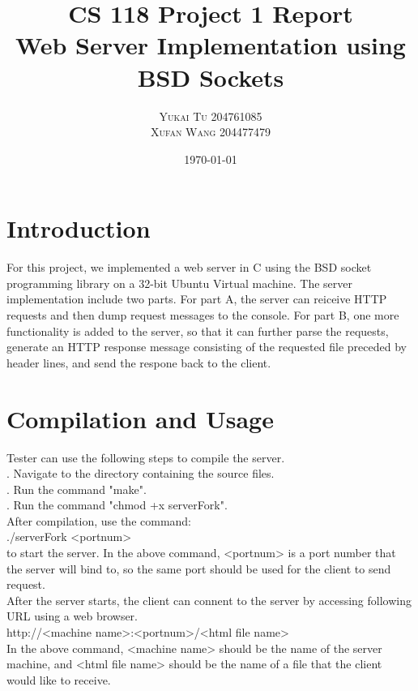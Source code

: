 \documentclass[a4paper, 11pt]{report}
\title{\LARGE{\textbf{CS 118 Project 1 Report}}\\
Web Server Implementation using BSD Sockets}
\author{\textsc{Yukai Tu 204761085}
\\\textsc{Xufan Wang 204477479}}
\date{\today}
\begin{document}
\maketitle


\section*{Introduction}

For this project, we implemented a web server in C using the BSD socket programming library on a 32-bit Ubuntu Virtual machine. The server implementation include two parts. For part A, the server can reiceive HTTP requests and then dump request messages to the console. For part B, one more functionality is added to the server, so that it can further parse the requests, generate an HTTP response message consisting of the requested file preceded by header lines, and send the respone back to the client.


\section*{Compilation and Usage}

Tester can use the following steps to compile the server.
\scriptsize
{\selectfont
\mbox{}\\
. Navigate to the directory containing the source files. \\
. Run the command "make".\\
. Run the command "chmod +x serverFork".\\
}
\normalsize
After compilation, use the command:
\scriptsize
{\selectfont
\mbox{}\\
\indent./serverFork <portnum>\\
}
\normalsize
to start the server. In the above command, <portnum> is a port number that the server will bind to, so the same port should be used for the client to send request.\\
After the server starts, the client can connent to the server by accessing following URL using a web browser.
\scriptsize
{\selectfont
\mbox{}\\
\indent http://<machine name>:<portnum>/<html file name>\\
}
\normalsize
In the above command, <machine name> should be the name of the server machine, and <html file name> should be the name of a file that the client would like to receive.
\end{document}
